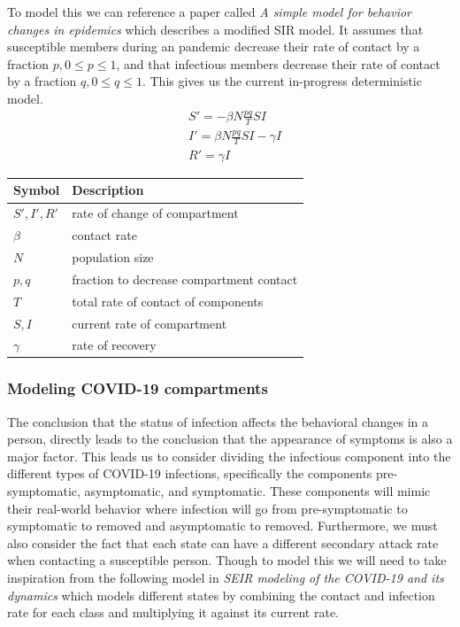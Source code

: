 \documentclass{article}
\begin{document}
To model this we can reference a paper called \textit{A simple model for behavior changes in epidemics} which describes a modified SIR model. It assumes that susceptible members during an pandemic decrease their rate of contact by a fraction $p, 0 \le p \le 1$, and that infectious members decrease their rate of contact by a fraction $q, 0 \le q \le 1$. This gives us the current in-progress deterministic model.
\begin{align*}
  & S' = -\beta N \frac{pq}{T}SI           \\
  & I' = \beta N \frac{pq}{T}SI - \gamma I \\
  & R' = \gamma I
\end{align*}

\begin{center}
  \begin{tabular}{|l|l|}
    \hline
    Symbol       & Description                              \\ [0.5ex]
    \hline\hline
    $S', I', R'$ & rate of change of compartment            \\
    \hline
    $\beta$      & contact rate                             \\
    \hline
    $N$          & population size                          \\
    \hline
    $p,q$        & fraction to decrease compartment contact \\
    \hline
    $T$          & total rate of contact of components      \\
    \hline
    $S, I$       & current rate of compartment              \\
    \hline
    $\gamma$     & rate of recovery                         \\
    \hline
  \end{tabular}
\end{center}
\cite{behavior}


\subsubsection{Modeling COVID-19 compartments}
The conclusion that the status of infection affects the behavioral changes in a person, directly leads to the conclusion that the appearance of symptoms is also a major factor. This leads us to consider dividing the infectious component into the different types of COVID-19 infections, specifically the components pre-symptomatic, asymptomatic, and symptomatic. These components will mimic their real-world behavior where infection will go from pre-symptomatic to symptomatic to removed and asymptomatic to removed. Furthermore, we must also consider the fact that each state can have a different secondary attack rate when contacting a susceptible person. \cite{review} Though to model this we will need to take inspiration from the following model in \textit{SEIR modeling of the COVID-19 and its dynamics} which models different states by combining the contact and infection rate for each class and multiplying it against its current rate.
\end{document}
